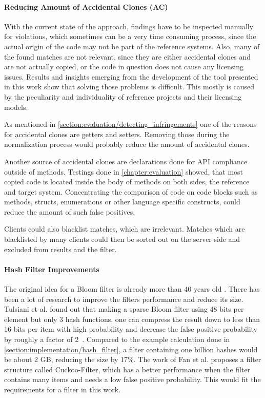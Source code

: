 \paragraph{Reducing Amount of Accidental Clones (AC)}
With the current state of the approach, findings have to be inspected manually for violations, which sometimes can be a very time consuming process, since the actual origin of the code may not be part of the reference systems.
Also, many of the found matches are not relevant, since they are either accidental clones and are not actually copied, or the code in question does not cause any licensing issues.
Results and insights emerging from the development of the tool presented in this work show that solving those problems is difficult.
This mostly is caused by the peculiarity and individuality of reference projects and their licensing models.

As mentioned in \autoref{section:evaluation/detecting_infringements} one of the reasons for accidental clones are getters and setters.
Removing those during the normalization process would probably reduce the amount of accidental clones.

Another source of accidental clones are declarations done for API compliance outside of methods.
Testings done in \autoref{chapter:evaluation} showed, that most copied code is located inside the body of methods on both sides, the reference and target system.
Concentrating the comparison of code on code blocks such as methods, structs, enumerations or other language specific constructs, could reduce the amount of such false positives.

Clients could also blacklist matches, which are irrelevant.
Matches which are blacklisted by many clients could then be sorted out on the server side and excluded from results and the filter.

\paragraph{Hash Filter Improvements}
The original idea for a Bloom filter is already more than 40 years old \cite{bloom1970filter}.
There has been a lot of research to improve the filters performance and reduce its size.
Tulsiani et al. found out that \glqq making a sparse Bloom filter using 48 bits per element but only 3 hash functions, one can compress the result down to less than 16 bits per item with high probability and decrease the false positive probability by roughly a factor of 2\grqq \ \cite{tulsiani2013probability}.
Compared to the example calculation done in \autoref{section:implementation/hash_filter}, a filter containing one billion hashes would be about 2 GB, reducing the size by 17\%.
The work of Fan et al. proposes a filter structure called Cuckoo-Filter, which has a better performance when the filter contains many items and needs a low false positive probability.
This would fit the requirements for a filter in this work.